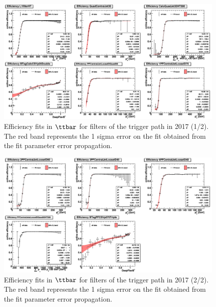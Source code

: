 \begin{figure}[htbp!]
\begin{center}
    \includegraphics[width=0.9\linewidth]{Figures/AnalysisStrategy/triggerfits/TriggerEfficiencies_2017_TTBarCut_TTbar_2017_1_Fit.png}
\end{center}
\caption[Efficiency fits in $\ttbar$ for filters of the trigger path in 2017 (1/2)]{Efficiency fits in $\ttbar$ for filters of the trigger path in 2017 (1/2). The red band represents the 1 sigma error on the fit obtained from the fit parameter error propagation.}
\label{trigger:fig:TTbarFilterEfficiency2017_1}
\end{figure}
   
\begin{figure}[htbp!]
\begin{center}
    \includegraphics[width=0.9\linewidth]{Figures/AnalysisStrategy/triggerfits/TriggerEfficiencies_2017_TTBarCut_TTbar_2017_2_Fit.png}
\end{center}
\caption[Efficiency fits in $\ttbar$ for filters of the trigger path in 2017 (2/2)]{Efficiency fits in $\ttbar$ for filters of the trigger path in 2017 (2/2). The red band represents the 1 sigma error on the fit obtained from the fit parameter error propagation.}
\label{trigger:fig:TTbarFilterEfficiency2017_2}
\end{figure}

